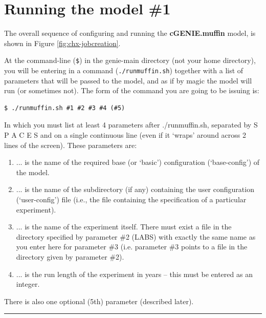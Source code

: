 \documentclass[11pt,fleqn]{book} %
\begin{document}

\newpage


\section{Running the model \#1}

The overall sequence of configuring and running the \textbf{cGENIE.muffin} model, is shown in Figure \ref{fig:chx-jobcreation}.

At the command-line (\texttt{\$}) in the genie-main directory (not your home directory), you will be entering in a command (\texttt{./runmuffin.sh}) together with a list of parameters that will be passed to the model, and as if by magic the model will run (or sometimes not). The form of the command you are going to be issuing is:

\begin{verbatim}
$ ./runmuffin.sh #1 #2 #3 #4 (#5)
\end{verbatim}

In which you must list at least 4 parameters after ./runmuffin.sh, separated by S P A C E S and on a single continuous line (even if it ‘wraps’ around across 2 lines of the screen).
These parameters are:

\begin{enumerate}[noitemsep]
\setlength{\itemindent}{.2in}
\item ... is the name of the required base (or ‘basic’) configuration (‘base-config’) of the model.
\item ... is the name of the subdirectory (if any) containing the user configuration (‘user-config’) file (i.e., the file containing the specification of a particular experiment). 
\item ... is the name of the experiment itself. There must exist a file in the directory specified by parameter \#2 (LABS) with exactly the same name as you enter here for parameter \#3 (i.e. parameter \#3 points to a file in the directory given by parameter \#2).
\item ... is the run length of the experiment in years – this must be entered as an integer.
\end{enumerate}

There is also one optional (5th) parameter (described later).

\vspace{1mm}
\noindent\rule{4cm}{0.1mm}
\vspace{2mm}
\end{document}
